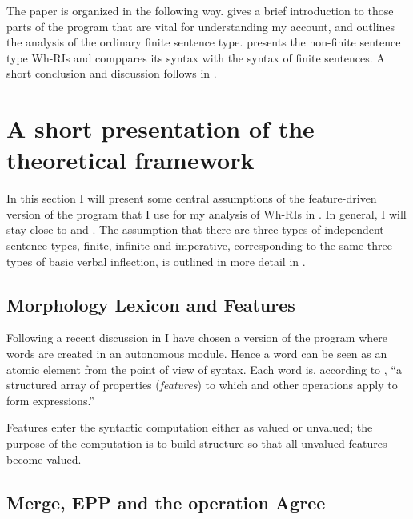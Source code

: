 \documentclass[output=paper]{LSP/langsci}
\begin{document}
  The paper is organized in the following way.  gives a brief introduction to those parts of the  program that are vital for understanding my account, and  outlines the analysis of the ordinary finite sentence type.  presents the non-finite sentence type Wh-RIs and comppares its syntax with the syntax of finite sentences. A short conclusion and discussion follows in . 

\section{A short presentation of the theoretical framework}\label{sec:platzack:2}

In this section I will present some central assumptions of the feature-driven version of the  program that I use for my analysis of Wh-RIs in . In general, I will stay close to \citet{Chomsky2007,Chomsky2008} and \citet{PesetskyTorrego2001,PesetskyTorrego2004,PesetskyTorrego2007}.  The assumption that there are three types of independent sentence types, finite, infinite and imperative, corresponding to the same three types of basic verbal inflection, is outlined in more detail in \citet{PlatzackRosengren2017}. 

\subsection{Morphology Lexicon and Features}

Following a recent discussion in  \citet{CecchettoDonati2015} I have chosen a version of the  program where words are created in an autonomous  module. Hence a word can be seen as an atomic element from the point of view of syntax. Each word is, according to \citet[6]{Chomsky2007}, “a structured array of  properties (\textit{features}) to which  and other operations apply to form expressions.”  

Features enter the syntactic computation either as valued or unvalued; the purpose of the computation is to build structure so that all unvalued features become valued.

 \subsection{Merge, EPP and the operation Agree}
\end{document}

